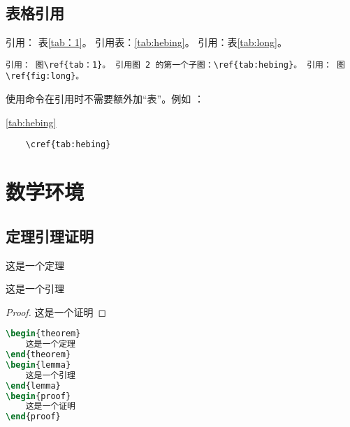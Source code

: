 \subsection{表格引用}
引用： 表\ref{tab：1}。 引用表：\ref{tab:hebing}。 引用：表\ref{tab:long}。
\begin{lstlisting}
引用： 图\ref{tab：1}。 引用图 2 的第一个子图：\ref{tab:hebing}。 引用： 图 \ref{fig:long}。
\end{lstlisting}

使用\myverb{\cref{}}命令在引用时不需要额外加“表”。例如 ：

\cref{tab:hebing}

\begin{lstlisting}
	\cref{tab:hebing}
\end{lstlisting}


\section{数学环境}
\subsection{定理引理证明}
\begin{theorem}
这是一个定理
\end{theorem}
\begin{lemma}
这是一个引理
\end{lemma}
\begin{proof}
这是一个证明
\end{proof}
\begin{lstlisting}[language=TeX]
\begin{theorem}
	这是一个定理
\end{theorem}
\begin{lemma}
	这是一个引理
\end{lemma}
\begin{proof}
	这是一个证明
\end{proof}
\end{lstlisting}

